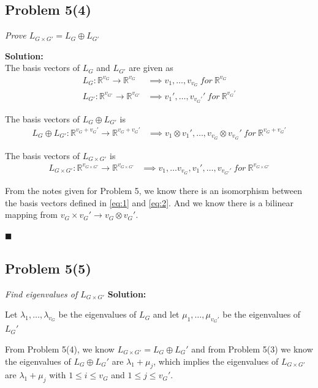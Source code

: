 \documentclass[12pt,a4paper]{article}
\newcommand{\rightqed}{
\begin{flushright}
$\blacksquare$
\end{flushright}
}
\newcommand{\solution}{\noindent\textbf{Solution:}\\\indent}
\begin{document}
\subsection*{Problem 5(4)}
\textit{
    Prove $L_{G\times G'} = L_G\oplus L_{G'}$
}

\solution
The basis vectors of $L_G$ and $L_{G'}$ are given as
\begin{align*}
    L_G: \mathbb{R}^{v_G} \rightarrow \mathbb{R}^{v_G} &\implies v_1, \hdots, v_{v_G}\ for\ \mathbb{R}^{v_G} \\
    L_{G'}: \mathbb{R}^{v_{G'}} \rightarrow \mathbb{R}^{v_{G'}} &\implies v_1', \hdots, v_{v_G'}'\ for\ \mathbb{R}^{v_G'}
\end{align*}

The basis vectors of $L_G \oplus L_{G'}$ is
\begin{align}
    L_G\oplus L_{G'}: \mathbb{R}^{v_{G}+v_G'} \rightarrow \mathbb{R}^{v_{G}+v_G'} &\implies v_1\otimes v_1', \hdots, v_{v_G}\otimes v_{v_G}'\ for\ \mathbb{R}^{v_G+v_G'} \label{eq:1}
\end{align}

The basis vectors of $L_{G\times G'}$ is
\begin{align}
    L_{G\times G'}: \mathbb{R}^{v_{G\times G'}} \rightarrow \mathbb{R}^{v_{G\times G'}} &\implies v_1, \hdots v_{v_G}, v_1', \hdots, v_{v_{G'}'}\ for\ \mathbb{R}^{v_{G\times G'}} \label{eq:2}
\end{align}

From the notes given for Problem 5, we know there is an isomorphism between the basis vectors defined in \eqref{eq:1} and \eqref{eq:2}. And we know there is a bilinear mapping from $v_G\times v_G' \rightarrow v_G\otimes v_G'$.
\rightqed

\newpage
\subsection*{Problem 5(5)}
\textit{
    Find eigenvalues of $L_{G\times G'}$
}
\solution

Let $\lambda_1, \hdots, \lambda_{v_G}$ be the eigenvalues of $L_G$ and let $\mu_1, \hdots, \mu_{v_G'}$ be the eigenvalues of $L_G'$ 

From Problem 5(4), we know $L_{G\times G'} = L_G\oplus L_G'$ and from Problem 5(3) we know the eigenvalues of $L_G\oplus L_G'$ are $\lambda_1 + \mu_j$, which implies the eigenvalues of $L_{G\times G'}$ are $\lambda_1 + \mu_j$ with $1 \leq i \leq v_G$ and $1 \leq j \leq v_G'$.
\end{document}

